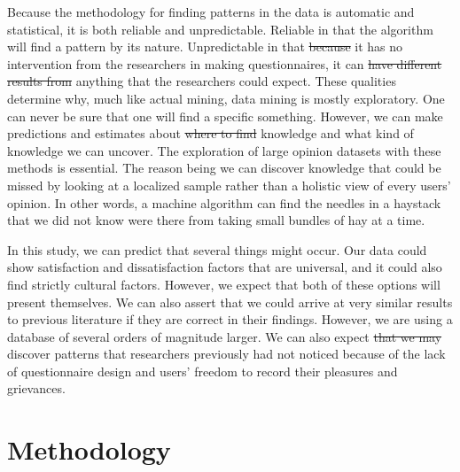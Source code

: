 \documentclass[smallextended,natbib]{svjour3}       %
\providecommand{\DIFadd}[1]{{\protect\color{blue}\uwave{#1}}} %
\providecommand{\DIFdel}[1]{{\protect\color{red}\sout{#1}}}                      %
\providecommand{\DIFaddbegin}{} %
\providecommand{\DIFaddend}{} %
\providecommand{\DIFdelbegin}{} %
\providecommand{\DIFdelend}{} %
\newcommand{\DIFscaledelfig}{0.5}
\newlength{\DIFdelgraphicswidth} %
\newlength{\DIFdelgraphicsheight} %
\newcommand{\DIFaddincludegraphics}[2][]{{\color{blue}\fbox{\DIFOincludegraphics[#1]{#2}}}} %
\newcommand{\DIFdelincludegraphics}[2][]{%
\sbox{\DIFdelgraphicsbox}{\DIFOincludegraphics[#1]{#2}}%
\settoboxwidth{\DIFdelgraphicswidth}{\DIFdelgraphicsbox} %
\settoboxtotalheight{\DIFdelgraphicsheight}{\DIFdelgraphicsbox} %
\scalebox{\DIFscaledelfig}{%
\parbox[b]{\DIFdelgraphicswidth}{\usebox{\DIFdelgraphicsbox}\\[-\baselineskip] \rule{\DIFdelgraphicswidth}{0em}}\llap{\resizebox{\DIFdelgraphicswidth}{\DIFdelgraphicsheight}{%
\setlength{\unitlength}{\DIFdelgraphicswidth}%
\begin{picture}(1,1)%
\thicklines\linethickness{2pt} %
{\color[rgb]{1,0,0}\put(0,0){\framebox(1,1){}}}%
{\color[rgb]{1,0,0}\put(0,0){\line( 1,1){1}}}%
{\color[rgb]{1,0,0}\put(0,1){\line(1,-1){1}}}%
\end{picture}%
}\hspace*{3pt}}} %
} %
\DeclareRobustCommand{\DIFaddbegin}{\DIFOaddbegin \let\includegraphics\DIFaddincludegraphics} %
\DeclareRobustCommand{\DIFaddend}{\DIFOaddend \let\includegraphics\DIFOincludegraphics} %
\DeclareRobustCommand{\DIFdelbegin}{\DIFOdelbegin \let\includegraphics\DIFdelincludegraphics} %
\DeclareRobustCommand{\DIFdelend}{\DIFOaddend \let\includegraphics\DIFOincludegraphics} %
\begin{document}
    Because the methodology for finding patterns in the data is automatic and statistical, it is both reliable and unpredictable. Reliable in that the algorithm will find a pattern by its nature. Unpredictable in that \DIFdelbegin \DIFdel{because }\DIFdelend \DIFaddbegin \DIFadd{since }\DIFaddend it has no intervention from the researchers in making questionnaires, it can \DIFdelbegin \DIFdel{have different results from }\DIFdelend \DIFaddbegin \DIFadd{result in }\DIFaddend anything that the researchers could expect. These qualities determine why, much like actual mining, data mining is mostly exploratory. One can never be sure that one will find a specific something. However, we can make predictions and estimates about \DIFdelbegin \DIFdel{where to find }\DIFdelend \DIFaddbegin \DIFadd{finding }\DIFaddend knowledge and what kind of knowledge we can uncover. The exploration of large opinion datasets with these methods is essential. The reason being we can discover knowledge that could be missed by looking at a localized sample rather than a holistic view of every users' opinion. In other words, a machine algorithm can find the needles in a haystack that we did not know were there from taking small bundles of hay at a time.

    In this study, we can predict that several things might occur. Our data could show satisfaction and dissatisfaction factors that are universal, and it could also find strictly cultural factors. However, we expect that both of these options will present themselves. We can also assert that we could arrive at very similar results to previous literature if they are correct in their findings. However, we are using a database of several orders of magnitude larger. We can also expect \DIFdelbegin \DIFdel{that we may }\DIFdelend \DIFaddbegin \DIFadd{to }\DIFaddend discover patterns that researchers previously had not noticed because of the lack of questionnaire design and users' freedom to record their pleasures and grievances.


\section{Methodology}\label{method}
\end{document}
